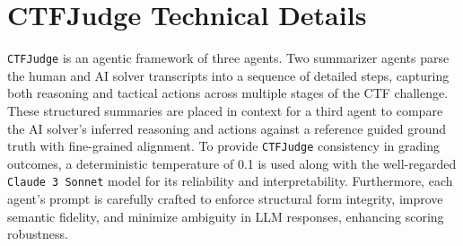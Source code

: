 \section{CTFJudge Technical Details}

\texttt{CTFJudge} is an agentic framework of three agents. Two summarizer agents parse the human and AI solver transcripts into a sequence of detailed steps, capturing both reasoning and tactical actions across multiple stages of the CTF challenge. These structured summaries are placed in context for a third agent to compare the AI solver’s inferred reasoning and actions against a reference guided ground truth with fine-grained alignment. To provide \texttt{CTFJudge} consistency in grading outcomes, a deterministic temperature of 0.1 is used along with the well-regarded \texttt{Claude 3 Sonnet} model for its reliability and interpretability. Furthermore, each agent's prompt is carefully crafted to enforce structural form integrity, improve semantic fidelity, and minimize ambiguity in LLM responses, enhancing scoring robustness.

